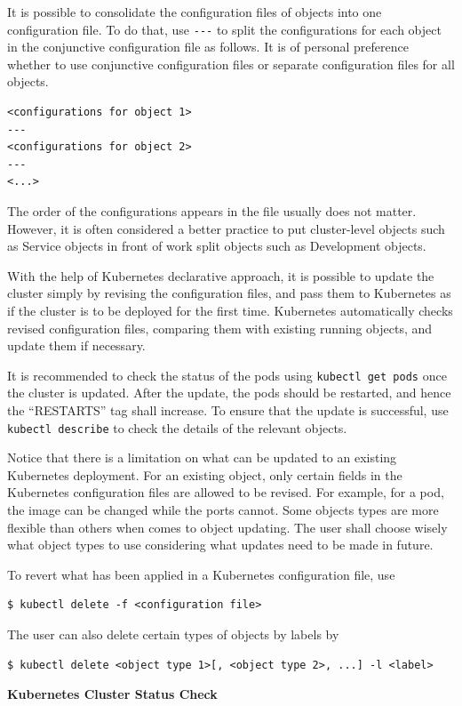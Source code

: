It is possible to consolidate the configuration files of objects into one configuration file. To do that, use \verb|---| to split the configurations for each object in the conjunctive configuration file as follows. It is of personal preference whether to use conjunctive configuration files or separate configuration files for all objects.
\begin{lstlisting}
<configurations for object 1>
---
<configurations for object 2>
---
<...>
\end{lstlisting}
The order of the configurations appears in the file usually does not matter. However, it is often considered a better practice to put cluster-level objects such as Service objects in front of work split objects such as Development objects.

With the help of Kubernetes declarative approach, it is possible to update the cluster simply by revising the configuration files, and pass them to Kubernetes as if the cluster is to be deployed for the first time. Kubernetes automatically checks revised configuration files, comparing them with existing running objects, and update them if necessary.

It is recommended to check the status of the pods using \verb|kubectl get pods| once the cluster is updated. After the update, the pods should be restarted, and hence the ``RESTARTS'' tag shall increase. To ensure that the update is successful, use \verb|kubectl describe| to check the details of the relevant objects.

Notice that there is a limitation on what can be updated to an existing Kubernetes deployment. For an existing object, only certain fields in the Kubernetes configuration files are allowed to be revised. For example, for a pod, the image can be changed while the ports cannot. Some objects types are more flexible than others when comes to object updating. The user shall choose wisely what object types to use considering what updates need to be made in future.

To revert what has been applied in a Kubernetes configuration file, use
\begin{lstlisting}
$ kubectl delete -f <configuration file>
\end{lstlisting}
The user can also delete certain types of objects by labels by
\begin{lstlisting}
$ kubectl delete <object type 1>[, <object type 2>, ...] -l <label>
\end{lstlisting}

\vspace{0.1in}
\noindent \textbf{Kubernetes Cluster Status Check}
\vspace{0.1in}

